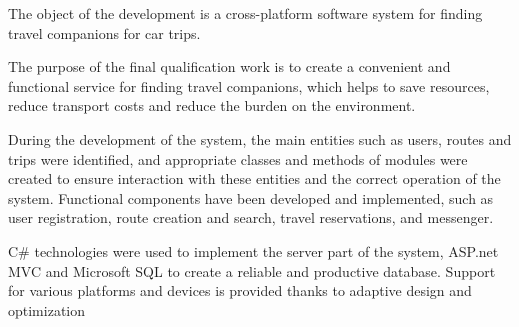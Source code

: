 The object of the development is a cross-platform software system for finding travel companions for car trips.

The purpose of the final qualification work is to create a convenient and functional service for finding travel companions, which helps to save resources, reduce transport costs and reduce the burden on the environment.

During the development of the system, the main entities such as users, routes and trips were identified, and appropriate classes and methods of modules were created to ensure interaction with these entities and the correct operation of the system. Functional components have been developed and implemented, such as user registration, route creation and search, travel reservations, and messenger.

C\# technologies were used to implement the server part of the system, ASP.net MVC and Microsoft SQL to create a reliable and productive database. Support for various platforms and devices is provided thanks to adaptive design and optimization

